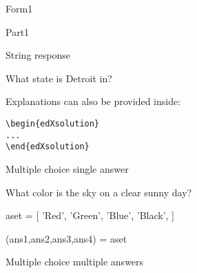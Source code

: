 
\begin{edXchapter}{Form1}


\begin{edXsection}{Part1}

\begin{edXvertical}

\begin{edXproblem}{String response}

What state is Detroit in?


\begin{edXsolution}

Explanations can also be provided inside:
\begin{verbatim}
\begin{edXsolution}
... 
\end{edXsolution}
\end{verbatim}

\end{edXsolution}

\end{edXproblem}


\end{edXvertical}


\begin{edXvertical}


\begin{edXproblem}{Multiple choice single answer}{}

What color is the sky on a clear sunny day?

\begin{edXscript}

aset = [ 'Red',
         'Green',
         'Blue',
         'Black',
      ]

(ans1,ans2,ans3,ans4) = aset

\end{edXscript}


\end{edXproblem}


\begin{edXproblem}{Multiple choice multiple answers}{}


\end{edXproblem}
\end{edXvertical}
\end{edXsection}
\end{edXchapter}
